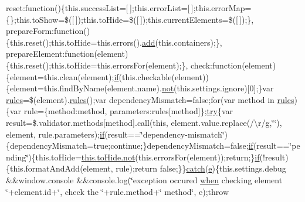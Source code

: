 \begin{DoxyCompactItemize}
reset\+:function()\{this.\+success\+List=\mbox{[}$\,$\mbox{]};this.\+error\+List=\mbox{[}$\,$\mbox{]};this.\+error\+Map=\{\};this.\+to\+Show=\$(\mbox{[}$\,$\mbox{]});this.\+to\+Hide=\$(\mbox{[}$\,$\mbox{]});this.\+current\+Elements=\$(\mbox{[}$\,$\mbox{]});\}, prepare\+Form\+:function()\{this.\+reset();this.\+to\+Hide=this.\+errors().\hyperlink{jquery-1_810_82-vsdoc_8js_a2f34e089948aad779d5a43c9b381caa6}{add}(this.\+containers);\}, prepare\+Element\+:function(element)\{this.\+reset();this.\+to\+Hide=this.\+errors\+For(element);\}, check\+:function(element)\{element=this.\+clean(element);\hyperlink{packages_2_respond_81_82_80_2content_2_scripts_2respond_8min_8js_a93851d60dd037a83509a1757b9ee7b66}{if}(this.\+checkable(element))\{element=this.\+find\+By\+Name(element.\+name).\hyperlink{jquery-1_810_82-vsdoc_8js_a78ab1ea877c73295e1e4cd1002ad38c7}{not}(this.\+settings.\+ignore)\mbox{[}0\mbox{]};\}var \hyperlink{packages_2_respond_81_82_80_2content_2_scripts_2respond_8js_ada87c2e257bc5ff6e77cdbc23ed986a3}{rules}=\$(element).\hyperlink{packages_2_respond_81_82_80_2content_2_scripts_2respond_8js_ada87c2e257bc5ff6e77cdbc23ed986a3}{rules}();var dependency\+Mismatch=false;for(var method in \hyperlink{packages_2_respond_81_82_80_2content_2_scripts_2respond_8js_ada87c2e257bc5ff6e77cdbc23ed986a3}{rules})\{var rule=\{method\+:method, parameters\+:rules\mbox{[}method\mbox{]}\};\hyperlink{packages_2j_query_81_810_82_2_content_2_scripts_2jquery-1_810_82_8js_abe4cc9788f52e49485473dc699537388}{try}\{var result=\$.validator.\+methods\mbox{[}method\mbox{]}.call(this, element.\+value.\+replace(/\textbackslash{}r/\hyperlink{packages_2_respond_81_82_80_2content_2_scripts_2respond_8min_8js_a103df269476e78897c9c4c6cb8f4eb06}{g},\char`\"{}\char`\"{}), element, rule.\+parameters);\hyperlink{packages_2_respond_81_82_80_2content_2_scripts_2respond_8min_8js_a93851d60dd037a83509a1757b9ee7b66}{if}(result==\char`\"{}dependency-\/mismatch\char`\"{})\{dependency\+Mismatch=true;continue;\}dependency\+Mismatch=false;\hyperlink{packages_2_respond_81_82_80_2content_2_scripts_2respond_8min_8js_a93851d60dd037a83509a1757b9ee7b66}{if}(result==\char`\"{}pending\char`\"{})\{this.\+to\+Hide=\hyperlink{jquery-1_810_82-vsdoc_8js_a78ab1ea877c73295e1e4cd1002ad38c7}{this.\+to\+Hide.\+not}(this.\+errors\+For(element));return;\}\hyperlink{packages_2_respond_81_82_80_2content_2_scripts_2respond_8min_8js_a93851d60dd037a83509a1757b9ee7b66}{if}(!result)\{this.\+format\+And\+Add(element, rule);return false;\}\}\hyperlink{packages_2j_query_81_810_82_2_content_2_scripts_2jquery-1_810_82_8js_a5bf45fc51bc0426586792b5f9cb95431}{catch}(\hyperlink{packages_2_respond_81_82_80_2content_2_scripts_2respond_8min_8js_a2c038346d47955cbe2cb91e338edd7e1}{e})\{this.\+settings.\+debug \&\&window.\+console \&\&console.\+log(\char`\"{}exception occured \hyperlink{jquery-1_810_82-vsdoc_8js_ad5b56e8490e5084272548eebb74b82d6}{when} checking element \char`\"{}+element.\+id+\char`\"{}, check the \textquotesingle{}\char`\"{}+rule.\+method+\char`\"{}\textquotesingle{} method\char`\"{}, e);throw 
\end{DoxyCompactItemize}
